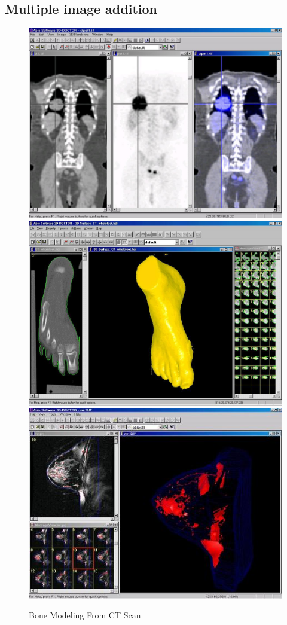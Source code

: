 \documentclass{article}
\begin{document}
\subsection{Multiple image addition}
\begin{figure}[h]
\includegraphics[scale= 0.5]{mul1.jpg}
\includegraphics[scale= 0.5]{mul2.jpg}
\includegraphics[scale= 0.7]{mul4.jpg}
\caption{Bone Modeling From CT  Scan}
\label{CT scan}
\end{figure}
\newpage
\end{document}

